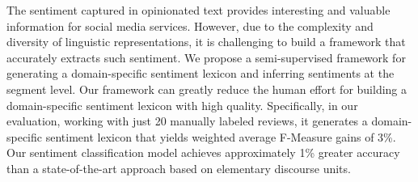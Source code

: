 The sentiment captured in opinionated text provides interesting and valuable information for social media services.  However, due to the complexity and diversity of linguistic representations, it is challenging to build a framework that accurately extracts such sentiment.  We propose a semi-supervised framework for generating a domain-specific sentiment lexicon and inferring sentiments at the segment level.                                      Our framework can greatly reduce the human effort for building a domain-specific sentiment lexicon with high quality.  Specifically, in our evaluation, working with just 20 manually labeled reviews, it generates a domain-specific sentiment lexicon that yields weighted average F-Measure gains of 3\%.  Our sentiment classification model achieves approximately 1\% greater accuracy than a state-of-the-art approach based on elementary discourse units.
